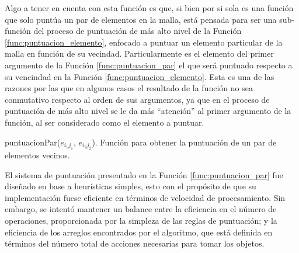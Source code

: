Algo a tener en cuenta con esta función es que, si bien por si sola es una función que solo puntúa un par de elementos en la malla, está pensada para ser una sub-función del proceso de puntuación de más alto nivel de la Función \ref{func:puntuacion_elemento}, enfocado a puntuar un elemento particular de la malla en función de su vecindad.
Particularmente es el elemento del primer argumento de la Función \ref{func:puntuacion_par} el que será puntuado respecto a su vencindad en la Función \ref{func:puntuacion_elemento}.
Esta es una de las razones por las que en algunos casos el resultado de la función no sea conmutativo respecto al orden de sus argumentos, ya que en el proceso de puntuación de más alto nivel se le da más ``atención'' al primer argumento de la función, al ser considerado como el elemento a puntuar.
%
\begin{center}
\begin{minipage}{0.9\textwidth}
\begin{function}[H]
	\OneHalfBlankLine
	\OneHalfBlankLine
	\caption{puntuacionPar($e_{i_1 j_1}$, $e_{i_2 j_2}$). Función para obtener la puntuación de un par de elementos vecinos.}%
	\label{func:puntuacion_par}%
\end{function}
\end{minipage}
\end{center}
%
El sistema de puntuación presentado en la Función \ref{func:puntuacion_par} fue diseñado en base a heurísticas simples, esto con el propósito de que su implementación fuese eficiente en términos de velocidad de procesamiento.
Sin embargo, se intentó mantener un balance entre la eficiencia en el número de operaciones, proporcionada por la simpleza de las reglas de puntuación; y la eficiencia de los arreglos encontrados por el algoritmo, que está definida en términos del número total de acciones necesarias para tomar los objetos.

